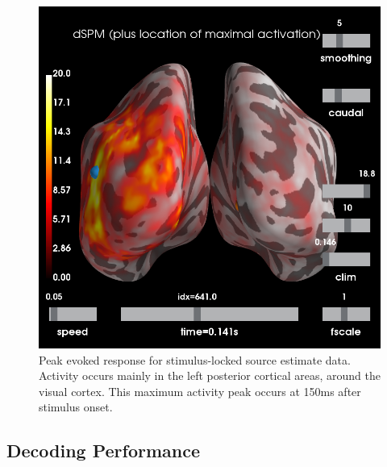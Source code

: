 \documentclass[../main.tex]{subfiles}
\begin{document}
\begin{figure}
    \centering
    \includegraphics[scale=0.5]{figures/results/fsaverage_caudalboth_t0.14.png}
    \caption{Peak evoked response for stimulus-locked source estimate data. Activity occurs mainly in the left posterior cortical areas, around the visual cortex. This maximum activity peak occurs at 150ms after stimulus onset.}
    \label{source_max}
\end{figure}


\subsection{Decoding Performance}
\end{document}
